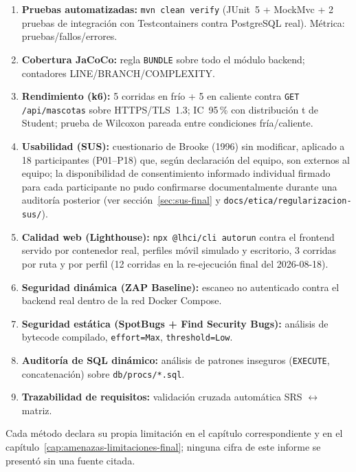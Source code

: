 \begin{enumerate}[nosep]
  \item \textbf{Pruebas automatizadas:} \texttt{mvn clean verify}
    (JUnit~5 + MockMvc + 2 pruebas de integraci\'on con Testcontainers
    contra PostgreSQL real). M\'etrica: pruebas/fallos/errores.
  \item \textbf{Cobertura JaCoCo:} regla \texttt{BUNDLE} sobre todo el
    m\'odulo backend; contadores LINE/BRANCH/COMPLEXITY.
  \item \textbf{Rendimiento (k6):} 5 corridas en fr\'io + 5 en caliente
    contra \texttt{GET /api/mascotas} sobre HTTPS/TLS~1.3; IC~95\,\% con
    distribuci\'on t de Student; prueba de Wilcoxon pareada entre
    condiciones fr\'ia/caliente.
  \item \textbf{Usabilidad (SUS):} cuestionario de Brooke (1996) sin
    modificar, aplicado a 18 participantes (P01--P18) que, seg\'un
    declaraci\'on del equipo, son externos al equipo; la disponibilidad
    de consentimiento informado individual firmado para cada
    participante no pudo confirmarse documentalmente durante una
    auditor\'ia posterior (ver secci\'on~\ref{sec:sus-final} y
    \texttt{docs/etica/regularizacion-sus/}).
  \item \textbf{Calidad web (Lighthouse):} \texttt{npx @lhci/cli autorun}
    contra el frontend servido por contenedor real, perfiles m\'ovil
    simulado y escritorio, 3 corridas por ruta y por perfil (12 corridas
    en la re-ejecuci\'on final del 2026-08-18).
  \item \textbf{Seguridad din\'amica (ZAP Baseline):} escaneo no
    autenticado contra el backend real dentro de la red Docker Compose.
  \item \textbf{Seguridad est\'atica (SpotBugs + Find Security Bugs):}
    an\'alisis de bytecode compilado, \texttt{effort=Max},
    \texttt{threshold=Low}.
  \item \textbf{Auditor\'ia de SQL din\'amico:} an\'alisis de patrones
    inseguros (\texttt{EXECUTE}, concatenaci\'on) sobre \texttt{db/procs/*.sql}.
  \item \textbf{Trazabilidad de requisitos:} validaci\'on cruzada
    autom\'atica SRS $\leftrightarrow$ matriz.
\end{enumerate}

Cada m\'etodo declara su propia limitaci\'on en el cap\'itulo
correspondiente y en el cap\'itulo~\ref{cap:amenazas-limitaciones-final}; ninguna
cifra de este informe se present\'o sin una fuente citada.

